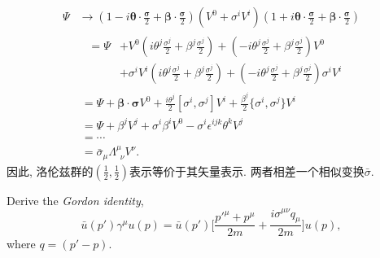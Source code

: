 \begin{equation}
  \begin{aligned}
    \Psi & \rightarrow (1 - i\bm{\theta}\cdot\tfrac{\bm{\sigma}}{2} + \bm{\beta}\cdot\tfrac{\bm{\sigma}}{2}) (V^0 + \sigma^i V^i) (1 + i\bm{\theta}\cdot\tfrac{\bm{\sigma}}{2} + \bm{\beta}\cdot\tfrac{\bm{\sigma}}{2}) \\
         & \begin{aligned}
             \ \ =\Psi & + V^0 (i\theta^j\tfrac{\sigma^j}{2} + \beta^j\tfrac{\sigma^j}{2}) + (-i\theta^j\tfrac{\sigma^j}{2} + \beta^j\tfrac{\sigma^j}{2}) V^0                   \\
                       & + \sigma^i V^i (i\theta^j\tfrac{\sigma^j}{2} + \beta^j\tfrac{\sigma^j}{2}) + (-i\theta^j\tfrac{\sigma^j}{2} + \beta^j\tfrac{\sigma^j}{2}) \sigma^i V^i
           \end{aligned}                                           \\
         & \ = \Psi + \bm{\beta}\cdot\bm{\sigma}V^0 + \tfrac{i\theta^j}{2}[\sigma^i, \sigma^j]V^i +  \tfrac{\beta^j}{2}\{\sigma^i, \sigma^j\}V^i                                                                        \\
         & \ = \Psi + \beta^j V^j + \sigma^i \beta^i V^0 - \sigma^i \epsilon^{ijk} \theta^k V^j                                                                                                                         \\
         & \ = \cdots                                                                                                                                                                                                   \\
         & \ = \bar{\sigma}_{\mu} \Lambda^{\mu}_{\phantom{0}\nu} V^{\nu}.
  \end{aligned}
\end{equation}
因此, 洛伦兹群的$(\frac{1}{2}, \frac{1}{2})$表示等价于其矢量表示.
两者相差一个相似变换$\bar{\sigma}$.

Derive the \textit{Gordon identity},
\begin{equation}\label{eq: gordon_idt}
  \bar{u}(p')\gamma^\mu u(p) = \bar{u}(p')\biggl[\frac{p'^\mu+p^\mu}{2m} + \frac{i\sigma^{\mu\nu}q_\mu}{2m}\biggr] u(p),
\end{equation}
where $q=(p'-p)$.

